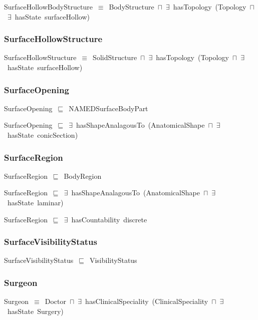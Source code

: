 \documentclass{article}
\begin{document}
SurfaceHollowBodyStructure~\ensuremath{\equiv}~BodyStructure~\ensuremath{\sqcap}~\ensuremath{\exists}~hasTopology~(Topology~\ensuremath{\sqcap}~\ensuremath{\exists}~hasState~surfaceHollow)

\subsubsection*{SurfaceHollowStructure}

SurfaceHollowStructure~\ensuremath{\equiv}~SolidStructure~\ensuremath{\sqcap}~\ensuremath{\exists}~hasTopology~(Topology~\ensuremath{\sqcap}~\ensuremath{\exists}~hasState~surfaceHollow)

\subsubsection*{SurfaceOpening}

SurfaceOpening~\ensuremath{\sqsubseteq}~NAMEDSurfaceBodyPart~

SurfaceOpening~\ensuremath{\sqsubseteq}~\ensuremath{\exists}~hasShapeAnalagousTo~(AnatomicalShape~\ensuremath{\sqcap}~\ensuremath{\exists}~hasState~conicSection)~

\subsubsection*{SurfaceRegion}

SurfaceRegion~\ensuremath{\sqsubseteq}~BodyRegion~

SurfaceRegion~\ensuremath{\sqsubseteq}~\ensuremath{\exists}~hasShapeAnalagousTo~(AnatomicalShape~\ensuremath{\sqcap}~\ensuremath{\exists}~hasState~laminar)~

SurfaceRegion~\ensuremath{\sqsubseteq}~\ensuremath{\exists}~hasCountability~discrete~

\subsubsection*{SurfaceVisibilityStatus}

SurfaceVisibilityStatus~\ensuremath{\sqsubseteq}~VisibilityStatus~

\subsubsection*{Surgeon}

Surgeon~\ensuremath{\equiv}~Doctor~\ensuremath{\sqcap}~\ensuremath{\exists}~hasClinicalSpeciality~(ClinicalSpeciality~\ensuremath{\sqcap}~\ensuremath{\exists}~hasState~Surgery)
\end{document}
